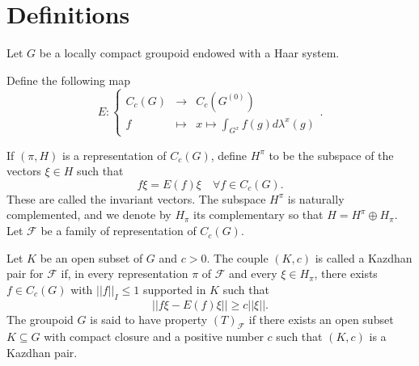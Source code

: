 \section{Definitions}

Let $G$ be a locally compact groupoid endowed with a Haar system. 

\begin{definition}
Define the following map
\[ E : \left\{ \begin{array}{rcl} 
C_c(G) & \rightarrow & C_c(G^{(0)}) \\
f & \mapsto & x\mapsto \int_{G^{x}} f(g) d\lambda^x(g)
\end{array}\right. .\]
\end{definition}

If $(\pi,H)$ is a representation of $C_c(G)$, define $H^\pi$ to be the subspace of the vectors $\xi \in H$ such that 
\[ f\xi = E(f)\xi \quad \forall f \in C_c(G).\]
These are called the invariant vectors. The subspace $H^\pi$ is naturally complemented, and we denote by $H_\pi$ its complementary so that $H = H^\pi \oplus H_\pi$.\\


Let $\mathcal F$ be a family of representation of $C_c(G)$.

\begin{definition}
Let $K$ be an open subset of $G$ and $c > 0$. The couple $(K,c)$ is called a Kazdhan pair for $\mathcal F$ if, in every representation $\pi $ of $\mathcal F$ and every $\xi \in H_\pi$, there exists $f\in C_c(G)$ with $||f||_I\leq 1$ supported in $K$ such that
\[ ||f\xi - E(f)\xi|| \geq c || \xi || .\]
The groupoid $G$ is said to have property $(T)_{\mathcal F}$ if there exists an open subset $K\subseteq G$ with compact closure and a positive number $c$ such that $(K,c)$ is a Kazdhan pair.  
\end{definition}
